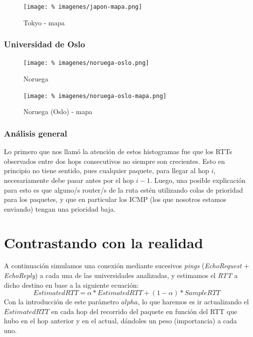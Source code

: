 \documentclass[final,inline,a4paper,narroweqnarray]{ieee}
\begin{document}
\begin{figure}[ht]\begin{center}
   \texttt{[image: \%
    imagenes/japon-mapa.png]}
    \caption{Tokyo - mapa}
    \label{Tokyo}
\end{center}\end{figure}

\subsubsection{Universidad de Oslo}
\begin{figure}[ht]\begin{center}
   \texttt{[image: \%
    imagenes/noruega-oslo.png]}
    \caption{Noruega}
    \label{Noruega}
\end{center}\end{figure}

\begin{figure}[ht]\begin{center}
   \texttt{[image: \%
    imagenes/noruega-oslo-mapa.png]}
    \caption{Noruega (Oslo) - mapa}
    \label{Noruega}
\end{center}\end{figure}

\subsubsection{Análisis general}

Lo primero que nos llamó la atención de estos histogramas fue que los RTTs
observados entre dos hops consecutivos no siempre son crecientes. Esto en
principio no tiene sentido, pues cualquier paquete, para llegar al hop $i$,
necesariamente debe pasar antes por el hop $i-1$. Luego, una posible explicación
para esto es que alguno/s router/s de la ruta estén utilizando colas de
prioridad para los paquetes, y que en particular los ICMP (los que nosotros
estamos enviando) tengan una prioridad baja.

\section{Contrastando con la realidad}
A continuación simulamos una conexión mediante sucesivos \emph{pings}
(\emph{EchoRequest} $+$ \emph{EchoReply}) a cada una de las universidades
analizadas, y estimamos el \emph{RTT} a dicho destino en base a la siguiente
ecuación:
\[
EstimatedRTT = \alpha * EstimatedRTT + (1 - \alpha) * SampleRTT
\]
Con la introducción de este parámetro $alpha$, lo que haremos es ir actualizando
el $EstimatedRTT$ en cada hop del recorrido del paquete en función del RTT que
hubo en el hop anterior y en el actual, dándoles un peso (importancia) a cada
uno.
\end{document}
